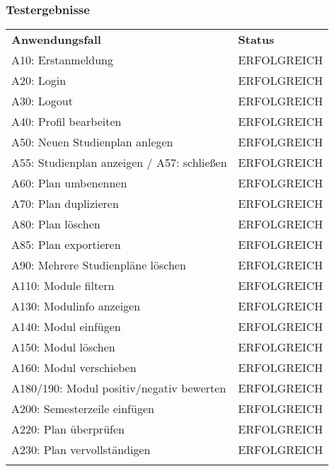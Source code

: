 \subsubsection*{Testergebnisse}

\begin{longtable}{| >{\hspace{0pt}} p{} | >{\hspace{0pt}} p{} |}
	\hline
	\textbf{Anwendungsfall} & \textbf{Status} \\ 
	\hhline{|=|=|}  
	\endfirsthead
	\endhead
	A10: Erstanmeldung & ERFOLGREICH \\
	\hline
	A20: Login & ERFOLGREICH \\
	\hline
	A30: Logout & ERFOLGREICH \\
	\hline
	A40: Profil bearbeiten & ERFOLGREICH \\
	\hline
	A50: Neuen Studienplan anlegen & ERFOLGREICH \\
	\hline
	A55: Studienplan anzeigen / A57: schließen & ERFOLGREICH \\
	\hline
	A60: Plan umbenennen & ERFOLGREICH \\
	\hline
	A70: Plan duplizieren & ERFOLGREICH \\
	\hline
	A80: Plan löschen & ERFOLGREICH \\
	\hline
	A85: Plan exportieren & ERFOLGREICH  \\
	\hline
	A90: Mehrere Studienpläne löschen & ERFOLGREICH \\
	\hline
	A110: Module filtern & ERFOLGREICH  \\
	\hline
	A130: Modulinfo anzeigen & ERFOLGREICH  \\
	\hline
	A140: Modul einfügen & ERFOLGREICH  \\
	\hline
	A150: Modul löschen & ERFOLGREICH  \\
	\hline
	A160: Modul verschieben & ERFOLGREICH  \\
	\hline
	A180/190: Modul positiv/negativ bewerten & ERFOLGREICH  \\
	\hline
	A200: Semesterzeile einfügen & ERFOLGREICH  \\
	\hline
	A220: Plan überprüfen & ERFOLGREICH \\
	\hline
	A230: Plan vervollständigen & ERFOLGREICH \\
	\hhline{|=|=|}
\end{longtable}

